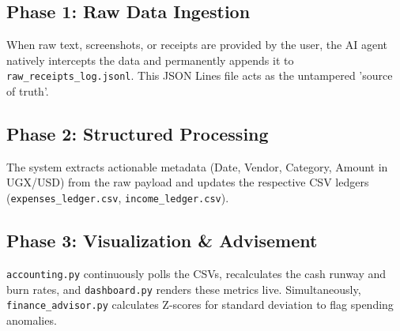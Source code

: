 \documentclass[12pt,a4paper]{article}
\begin{document}
\subsection{Phase 1: Raw Data Ingestion}
When raw text, screenshots, or receipts are provided by the user, the AI agent natively intercepts the data and permanently appends it to \texttt{raw\_receipts\_log.jsonl}. This JSON Lines file acts as the untampered 'source of truth'.

\subsection{Phase 2: Structured Processing}
The system extracts actionable metadata (Date, Vendor, Category, Amount in UGX/USD) from the raw payload and updates the respective CSV ledgers (\texttt{expenses\_ledger.csv}, \texttt{income\_ledger.csv}).

\subsection{Phase 3: Visualization \& Advisement}
\texttt{accounting.py} continuously polls the CSVs, recalculates the cash runway and burn rates, and \texttt{dashboard.py} renders these metrics live. Simultaneously, \texttt{finance\_advisor.py} calculates Z-scores for standard deviation to flag spending anomalies.
\end{document}
